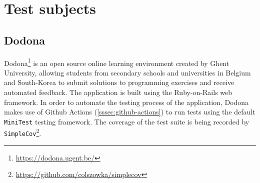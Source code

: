 
\section{Test subjects}

\subsection{Dodona}
Dodona\footnote{\url{https://dodona.ugent.be/}} is an open source online learning environment created by Ghent University, allowing students from secondary schools and universities in Belgium and South-Korea to submit solutions to programming exercises and receive automated feedback. The application is built using the Ruby-on-Rails web framework. In order to automate the testing process of the application, Dodona makes use of Github Actions (\autoref{sssec:github-actions}) to run tests using the default \texttt{MiniTest} testing framework. The coverage of the test suite is being recorded by \texttt{SimpleCov}\footnote{\url{https://github.com/colszowka/simplecov}}.